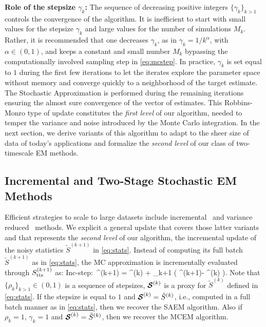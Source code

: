 \documentclass[journal, 11pt]{IEEEtran}
\begin{document}
\vspace{0.08in}
\noindent \textbf{Role of the stepsize $\gamma_k$:}  The sequence of decreasing positive integers $\{ \gamma_{k} \}_{k>1}$ controls the convergence of the algorithm.
It is inefficient to start with small values for the stepsize $\gamma_k$ and large values for the number of simulations $M_k$. 
Rather, it is recommended that one decreases $\gamma_k$, as in $\gamma_k = 1/k^\alpha$, with $\alpha \in (0,1)$, and keeps a constant and small number $M_k$ bypassing the computationally involved sampling step in \eqref{eq:mcstep}.
 In practice, $\gamma_k$ is set equal to $1$ during the first few iterations to let the iterates explore the parameter space without memory and converge quickly to a neighborhood of the target estimate. 
 The Stochastic Approximation is performed during the remaining iterations ensuring the almost sure convergence of the vector of estimates.
This Robbins-Monro type of update constitutes the \textit{first level} of our algorithm, needed to temper the variance and noise introduced by the Monte Carlo integration.
In the next section, we derive variants of this algorithm to adapt to the sheer size of data of today's applications and formalize the \textit{second level} of our class of two-timescale EM methods.


\subsection{Incremental and Two-Stage Stochastic EM Methods} \label{sec:sEM}

Efficient strategies to scale to large datasets include incremental~\cite{neal1998view} and variance reduced~\cite{chen2018stochastic, johnson:zhang:2013} methods.
We explicit a general update that covers those latter variants and that represents the \textit{second level} of our algorithm, \ie the incremental update of the noisy statistics $\tilde{S}^{(k+1)}$ in \eqref{eq:stats}. 
Instead of computing its full batch $\tilde{S}^{(k+1)}$ as in \eqref{eq:stats}, the MC approximation is incrementally evaluated through $S_{\textrm{tts}}^{(k+1)}$ as:
\beq \label{eq:sestep}
\textsf{Inc-step}:~\stt^{(k+1)} = \stt^{(k)} + \rho_{k+1} \big( \StocEstep^{(k+1)}- \stt^{(k)}  \big)\eqs.
\eeq
Note that $\{ \rho_{k} \}_{k>1} \in (0,1)$ is a sequence of stepsizes, ${\bm{\mathcal{S}}}^{(k)}$ is a proxy for $\tilde{S}^{(k)}$ defined in \eqref{eq:stats}.
If the stepsize is equal to $1$ and ${\bm{\mathcal{S}}}^{(k)} = \tilde{S}^{(k)}$, i.e., computed in a full batch manner as in \eqref{eq:stats}, then we recover the SAEM algorithm.
Also if $\rho_{k}=1$, $\gamma_{k}=1$ and ${\bm{\mathcal{S}}}^{(k)} = \tilde{S}^{(k)}$, then we recover the MCEM algorithm.
\end{document}
